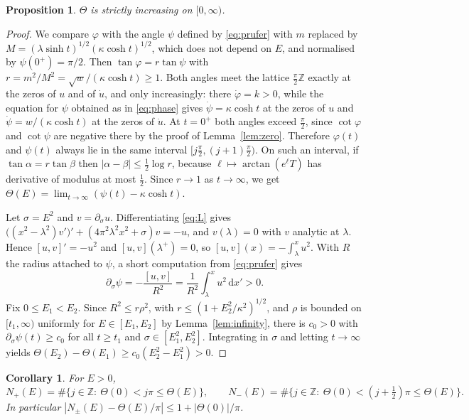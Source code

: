 \documentclass[11pt]{amsart}
\newtheorem{proposition}[theorem]{Proposition}
\newtheorem{corollary}[theorem]{Corollary}
\theoremstyle{definition}
\newcommand{\ZZ}{\mathbb{Z}}
\newcommand{\dd}{\,\mathrm{d}}
\begin{document}
\begin{proposition}\label{prop:monotone}
$\Theta$ is strictly increasing on $[0,\infty)$.
\end{proposition}

\begin{proof}
We compare $\varphi$ with the angle $\psi$ defined by \eqref{eq:prufer} with $m$ replaced by $M=(\lambda\sinh t)^{1/2}(\kappa\cosh t)^{1/2}$, which does not depend on $E$, and normalised by $\psi(0^+)=\pi/2$. Then $\tan\varphi=r\tan\psi$ with $r=m^2/M^2=\sqrt{w}/(\kappa\cosh t)\ge1$. Both angles meet the lattice $\frac\pi2\ZZ$ exactly at the zeros of $u$ and of $\dot u$, and only increasingly: there $\dot\varphi=k>0$, while the equation for $\psi$ obtained as in \eqref{eq:phase} gives $\dot\psi=\kappa\cosh t$ at the zeros of $u$ and $\dot\psi=w/(\kappa\cosh t)$ at the zeros of $\dot u$. At $t=0^+$ both angles exceed $\frac\pi2$, since $\cot\varphi$ and $\cot\psi$ are negative there by the proof of Lemma~\ref{lem:zero}. Therefore $\varphi(t)$ and $\psi(t)$ always lie in the same interval $[j\frac\pi2,(j+1)\frac\pi2)$. On such an interval, if $\tan\alpha=r\tan\beta$ then $|\alpha-\beta|\le\frac12\log r$, because $\ell\mapsto\arctan(e^\ell T)$ has derivative of modulus at most $\frac12$. Since $r\to1$ as $t\to\infty$, we get $\Theta(E)=\lim_{t\to\infty}(\psi(t)-\kappa\cosh t)$.

Let $\sigma=E^2$ and $v=\partial_\sigma u$. Differentiating \eqref{eq:L} gives $\big((x^2-\lambda^2)v'\big)'+(4\pi^2\lambda^2x^2+\sigma)v=-u$, and $v(\lambda)=0$ with $v$ analytic at $\lambda$. Hence $[u,v]'=-u^2$ and $[u,v](\lambda^+)=0$, so $[u,v](x)=-\int_\lambda^xu^2$. With $R$ the radius attached to $\psi$, a short computation from \eqref{eq:prufer} gives
\[
\partial_\sigma\psi=-\frac{[u,v]}{R^2}=\frac{1}{R^2}\int_\lambda^x u^2\dd x'>0 .
\]
Fix $0\le E_1<E_2$. Since $R^2\le r\rho^2$, with $r\le(1+E_2^2/\kappa^2)^{1/2}$, and $\rho$ is bounded on $[t_1,\infty)$ uniformly for $E\in[E_1,E_2]$ by Lemma~\ref{lem:infinity}, there is $c_0>0$ with $\partial_\sigma\psi(t)\ge c_0$ for all $t\ge t_1$ and $\sigma\in[E_1^2,E_2^2]$. Integrating in $\sigma$ and letting $t\to\infty$ yields $\Theta(E_2)-\Theta(E_1)\ge c_0(E_2^2-E_1^2)>0$.
\end{proof}

\begin{corollary}\label{cor:count}
For $E>0$,
\[
N_+(E)=\#\{j\in\ZZ:\ \Theta(0)<j\pi\le\Theta(E)\},\qquad N_-(E)=\#\{j\in\ZZ:\ \Theta(0)<(j+\tfrac12)\pi\le\Theta(E)\}.
\]
In particular $|N_\pm(E)-\Theta(E)/\pi|\le1+|\Theta(0)|/\pi$.
\end{corollary}
\end{document}

